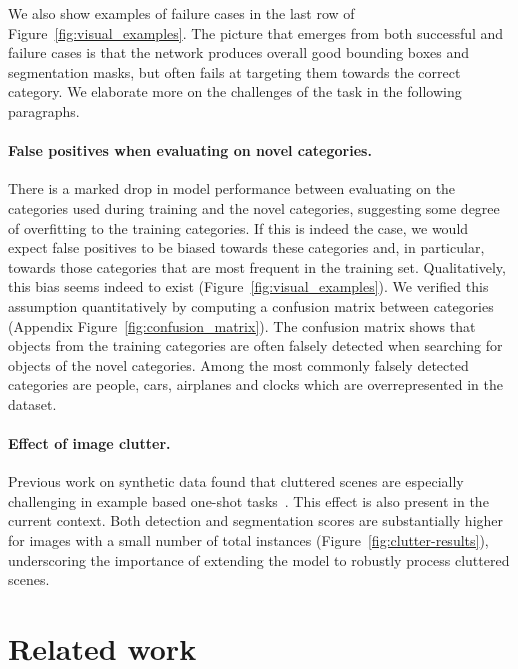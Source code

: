 \documentclass{article}
\begin{document}
We also show examples of failure cases in the last row of Figure~\ref{fig:visual_examples}. The picture that emerges from both successful and failure cases is that the network produces overall good bounding boxes and segmentation masks, but often fails at targeting them towards the correct category. We elaborate more on the challenges of the task in the following paragraphs.


\paragraph{False positives when evaluating on novel categories.}

There is a marked drop in model performance between evaluating on the categories used during training and the novel categories, suggesting some degree of overfitting to the training categories. If this is indeed the case, we would expect false positives to be biased towards these categories and, in particular, towards those categories that are most frequent in the training set. Qualitatively, this bias seems indeed to exist (Figure~\ref{fig:visual_examples}). We verified this assumption quantitatively by computing a confusion matrix between categories (Appendix Figure~\ref{fig:confusion_matrix}). The confusion matrix shows that objects from the training categories are often falsely detected when searching for objects of the novel categories. Among the most commonly falsely detected categories are people, cars, airplanes and clocks which are overrepresented in the dataset.



\paragraph{Effect of image clutter.}

Previous work on synthetic data found that cluttered scenes are especially challenging in example based one-shot tasks~\cite{Michaelis2018}. This effect is also present in the current context. Both detection and segmentation scores are substantially higher for images with a small number of total instances (Figure~\ref{fig:clutter-results}), underscoring the importance of extending the model to robustly process cluttered scenes.



\section{Related work}
\label{sec:related_work}
\end{document}
